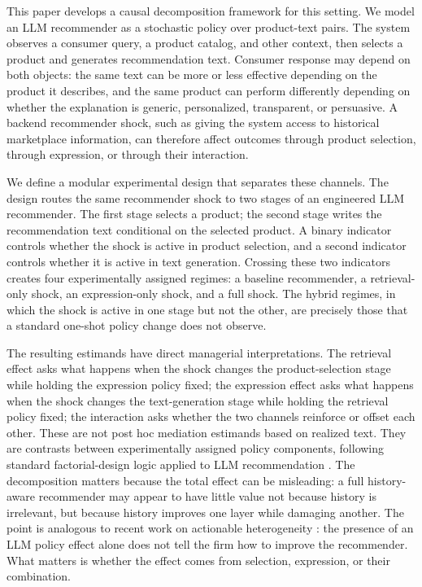 \documentclass[11pt]{article}
\begin{document}
This paper develops a causal decomposition framework for this setting. We model an LLM recommender as a stochastic policy over product-text pairs. The system observes a consumer query, a product catalog, and other context, then selects a product and generates recommendation text. Consumer response may depend on both objects: the same text can be more or less effective depending on the product it describes, and the same product can perform differently depending on whether the explanation is generic, personalized, transparent, or persuasive. A backend recommender shock, such as giving the system access to historical marketplace information, can therefore affect outcomes through product selection, through expression, or through their interaction.

We define a modular experimental design that separates these channels. The design routes the same recommender shock to two stages of an engineered LLM recommender. The first stage selects a product; the second stage writes the recommendation text conditional on the selected product. A binary indicator controls whether the shock is active in product selection, and a second indicator controls whether it is active in text generation. Crossing these two indicators creates four experimentally assigned regimes: a baseline recommender, a retrieval-only shock, an expression-only shock, and a full shock. The hybrid regimes, in which the shock is active in one stage but not the other, are precisely those that a standard one-shot policy change does not observe.

The resulting estimands have direct managerial interpretations. The retrieval effect asks what happens when the shock changes the product-selection stage while holding the expression policy fixed; the expression effect asks what happens when the shock changes the text-generation stage while holding the retrieval policy fixed; the interaction asks whether the two channels reinforce or offset each other. These are not post hoc mediation estimands based on realized text. They are contrasts between experimentally assigned policy components, following standard factorial-design logic applied to LLM recommendation \citep{egami2019causal, muralidharan2025factorial}. The decomposition matters because the total effect can be misleading: a full history-aware recommender may appear to have little value not because history is irrelevant, but because history improves one layer while damaging another. The point is analogous to recent work on actionable heterogeneity \citep{shchetkina2024actionable}: the presence of an LLM policy effect alone does not tell the firm how to improve the recommender. What matters is whether the effect comes from selection, expression, or their combination.
\end{document}
